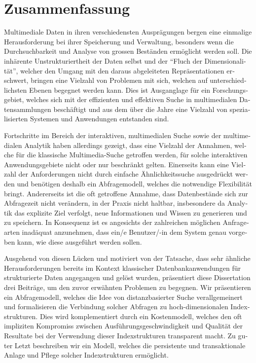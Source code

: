 
\chapter{Zusammenfassung}

\begin{otherlanguage}{ngerman}
Multimediale Daten in ihren verschiedensten Ausprägungen bergen eine einmalige Herausforderung bei ihrer Speicherung und Verwaltung, besonders wenn die Durchsuchbarkeit und Analyse von grossen Beständen ermöglicht werden soll. Die inhärente Unstrukturiertheit der Daten selbst und der ``Fluch der Dimensionalität'', welcher den Umgang mit den daraus abgeleiteten Repräsentationen erschwert, bringen eine Vielzahl von Problemen mit sich, welchen auf unterschiedlichsten Ebenen begegnet werden kann. Dies ist Ausganglage für ein Forschungsgebiet, welches sich mit der effizienten und effektiven Suche in multimedialen Datensammlungen beschäftigt und aus dem über die Jahre eine Vielzahl von spezialisierten Systemen und Anwendungen entstanden sind.

Fortschritte im Bereich der interaktiven, multimedialen Suche sowie der multimedialen Analytik haben allerdings gezeigt, dass eine Vielzahl der Annahmen, welche für die klassische Multimedia-Suche getroffen werden, für solche interaktiven Anwendungsgebiete nicht oder nur beschränkt gelten. Einerseits kann eine Vielzahl der Anforderungen nicht durch einfache Ähnlichkeitssuche ausgedrückt werden und benötigen deshalb ein Abfragemodell, welches die notwendige Flexibilität bringt. Andererseits ist die oft getroffene Annahme, dass Datenbestände sich zur Abfragezeit nicht verändern, in der Praxis nicht haltbar, insbesondere da Analytik das explizite Ziel verfolgt, neue Informationen und Wissen zu generieren und zu speichern. In Konsequenz ist es angesichts der zahlreichen möglichen Anfragearten inadäquat anzunehmen, dass ein/e Benutzer/-in dem System genau vorgeben kann, wie diese ausgeführt werden sollen.
 
Ausgehend von diesen Lücken und motiviert von der Tatsache, dass sehr ähnliche Herausforderungen bereits im Kontext klassischer Datenbankanwendungen für strukturierte Daten angegangen und gelöst wurden, präsentiert diese Dissertation drei Beiträge, um den zuvor erwähnten Problemen zu begegnen. Wir präsentieren ein Abfragemodell, welches die Idee von distanzbasierter Suche verallgemeinert und formalisieren die Verbindung solcher Abfragen zu hoch-dimensionalen Indexstrukturen. Dies wird komplementiert durch ein Kostenmodell, welches den oft impliziten Kompromiss zwischen Ausführungsgeschwindigkeit und Qualität der Resultate bei der Verwendung dieser Indexstrukturen transparent macht. Zu guter Letzt beschreiben wir ein Modell, welches die persistente und transaktionale Anlage und Pflege solcher Indexstrukturen ermöglicht.


\end{otherlanguage}
